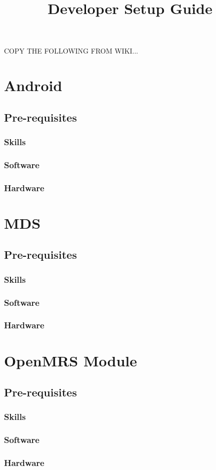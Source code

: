 \documentclass[a4paper,10pt]{article}
\title{Developer Setup Guide}
\author{}
\begin{document}
\maketitle

\begin{abstract}

\end{abstract}

COPY THE FOLLOWING FROM WIKI...

\section{Android}
\subsection{Pre-requisites}
\subsubsection{Skills}
\subsubsection{Software}
\subsubsection{Hardware}


\section{MDS}
\subsection{Pre-requisites}
\subsubsection{Skills}
\subsubsection{Software}
\subsubsection{Hardware}


\section{OpenMRS Module}
\subsection{Pre-requisites}
\subsubsection{Skills}
\subsubsection{Software}
\subsubsection{Hardware}
\end{document}
